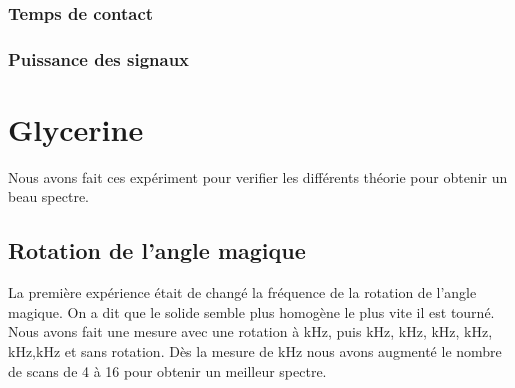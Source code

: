 \documentclass[a4paper,12pt]{scrartcl}
\begin{document}
    \subsubsection{Temps de contact}

    \subsubsection{Puissance des signaux}

 \section{Glycerine}
  Nous avons fait ces expériment pour verifier les différents théorie pour obtenir un beau spectre.

  \subsection{Rotation de l'angle magique}
   La première expérience était de changé la fréquence de la rotation de l'angle magique. On a dit que le solide semble plus homogène le plus vite il est tourné. Nous avons fait une mesure avec une rotation à \unit[4]{kHz}, puis \unit[3]{kHz}, \unit[2]{kHz}, \unit[1]{kHz}, \unit[0,75]{kHz}, \unit[0,5]{kHz},\unit[0,2]{kHz} et sans rotation. Dès la mesure de \unit[0,75]{kHz} nous avons augmenté le nombre de scans de 4 à 16 pour obtenir un meilleur spectre. 
\end{document}
